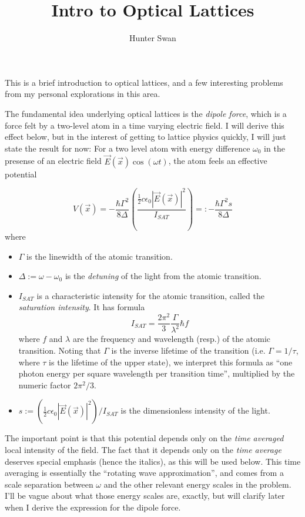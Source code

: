 \documentclass[aps,prb,floatfix,amsmath,amssymb,groupedaddress]{revtex4}
\begin{document}
\providecommand{\half}{{\frac{1}{2}}}		%
\providecommand{\dt}{{\partial_t}}

\title{Intro to Optical Lattices}

\author{Hunter Swan}

\maketitle

This is a brief introduction to optical lattices, and a few interesting problems from my personal explorations in this area.

The fundamental idea underlying optical lattices is the \textit{dipole force}, which is a force felt by a two-level atom in a time varying electric field.  I will derive this effect below, but in the interest of getting to lattice physics quickly, I will just state the result for now:  For a two level atom with energy difference $\omega_0$ in the presense of an electric field $\vec{E}(\vec{x})\cos(\omega t)$, the atom feels an effective potential 

\begin{equation} %
V(\vec{x}) = -\frac{\hbar \Gamma^2}{8\Delta} \left(\frac{\half c \epsilon_0 \left|\vec{E}(\vec{x})\right|^2}{I_{SAT}}\right) =: -\frac{\hbar\Gamma^2 s}{8\Delta}
\label{dipoleForce}
\end{equation}
where
\begin{itemize}
\item $\Gamma$ is the linewidth of the atomic transition.
\item $\Delta:= \omega-\omega_0$ is the \textit{detuning} of the light from the atomic transition. 
\item $I_{SAT}$ is a characteristic intensity for the atomic transition, called the \textit{saturation intensity}.  It has formula $$I_{SAT} = \frac{2\pi^2}{3} \frac{\Gamma}{\lambda^2} \hbar f$$ where $f$ and $\lambda$ are the frequency and wavelength (resp.) of the atomic transition.  Noting that $\Gamma$ is the inverse lifetime of the transition (i.e. $\Gamma = 1/\tau$, where $\tau$ is the lifetime of the upper state), we interpret this formula as ``one photon energy per square wavelength per transition time'', multiplied by the numeric factor $2\pi^2/3$.
\item $s:= \left(\half c \epsilon_0 \left|\vec{E}(\vec{x})\right|^2\right)/I_{SAT} $ is the dimensionless intensity of the light. 
\end{itemize}
The important point is that this potential depends only on the \textit{time averaged} local intensity of the field.  The fact that it depends only on the \textit{time average} deserves special emphasis (hence the italics), as this will be used below.  This time averaging is essentially the ``rotating wave approximation'', and comes from a scale separation between $\omega$ and the other relevant energy scales in the problem.  I'll be vague about what those energy scales are, exactly, but will clarify later when I derive the expression for the dipole force.  
\end{document}
